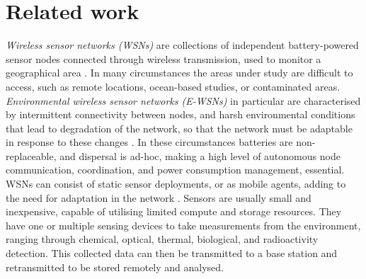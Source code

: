 \section{Related work}
\label{section:background}

\ifdefined\DEBUG {} \else \fi
\textit{Wireless sensor networks (WSNs)} are collections of independent battery-powered sensor nodes connected through wireless transmission, used to monitor a geographical area \citep{Akyildiz,Yick2008a}. In many circumstances the areas under study are difficult to access, such as remote locations, ocean-based studies, or contaminated areas. \textit{Environmental wireless sensor networks (E-WSNs)} in particular are characterised by intermittent connectivity between nodes, and harsh environmental conditions that lead to degradation of the network, so that the network must be adaptable in response to these changes \citep{Oliveira2011}. In these circumstances batteries are non-replaceable, and dispersal is ad-hoc, making a high level of autonomous node communication, coordination, and power consumption management, essential. WSNs can consist of static sensor deployments, or as mobile agents, adding to the need for adaptation in the network \citep{ramasamy2017mobile, 4224091}. Sensors are usually small and inexpensive, capable of utilising limited compute and storage resources. They have one or multiple sensing devices to take measurements from the environment, ranging through chemical, optical, thermal, biological, and radioactivity detection. This collected data can then be transmitted to a base station and retransmitted to be stored remotely and analysed.

